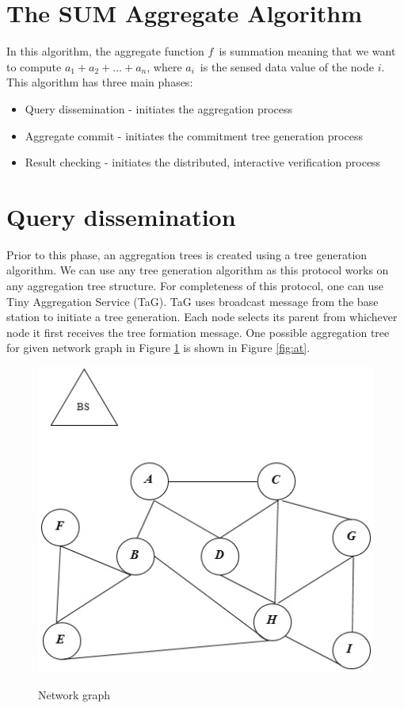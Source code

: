 	\section{The SUM Aggregate Algorithm}
		In this algorithm, the aggregate function $f$\ is summation meaning that we want to compute $a_{1} + a_{2} + \dotsc + a_{n}$, where $a_{i}$\ is the sensed data value of the node $i$.
		This algorithm has three main phases:
		\begin{itemize}
			\item Query dissemination - initiates the aggregation process
			\item Aggregate commit - initiates the commitment tree generation process
			\item Result checking - initiates the distributed, interactive verification process
		\end{itemize}

	\section{Query dissemination}
		Prior to this phase, an aggregation trees is created using a tree generation algorithm.
		We can use any tree generation algorithm as this protocol works on any aggregation tree structure.
		For completeness of this protocol, one can use Tiny Aggregation Service (TaG)\cite{madden2002tag}.
		TaG uses broadcast message from the base station to initiate a tree generation.
		Each node selects its parent from whichever node it first receives the tree formation message.
		One possible aggregation tree for given network graph in Figure \ref{fig:ng} is shown in Figure \ref{fig:at}. 
		\begin{figure}[h!]
			\centering
			\includegraphics[scale = 1]{images/network-graph.png}\\
			\caption{Network graph}
			\label{fig:ng}
		\end{figure}
		
